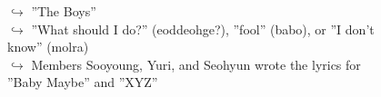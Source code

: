 \documentclass[11pt,a4paper, onecolumn]{article}
\begin{document}
\begin{figure}[t]
\begin{tcolorbox}[boxsep=0pt,left=5pt,right=0pt,top=2pt,colback = yellow!5]
\begin{dialogue}
\colorbox{pink!25}{$\hookrightarrow$}
{ ''The Boys'' }
\\
\colorbox{pink!25}{$\hookrightarrow$}
{ ''What should I do?'' (eoddeohge?), ''fool'' (babo), or ''I don't know'' (molra) }
\\
\colorbox{pink!25}{$\hookrightarrow$}
{ Members Sooyoung, Yuri, and Seohyun wrote the lyrics for ''Baby Maybe'' and ''XYZ'' }
\\
 \end{dialogue}\end{tcolorbox}\end{figure}
\end{document}
